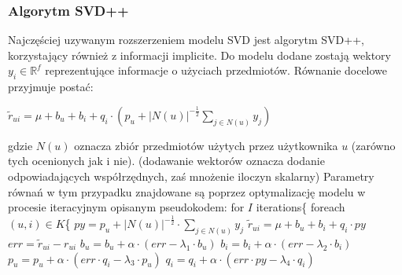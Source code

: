 \documentclass{pracamgr}
\begin{document}
    \subsubsection{Algorytm SVD++}
     Najczęściej uzywanym rozszerzeniem modelu SVD jest algorytm SVD++, korzystający również z informacji implicite.
     Do modelu dodane zostają wektory $y_i\in\mathbb{R}^f$ reprezentujące informacje o użyciach przedmiotów.
     Równanie docelowe przyjmuje postać:
     \begin{center}
      $\tilde{r}_{ui}=\mu+b_u+b_i+q_i\cdot\left(p_u +|N(u)|^{-\frac{1}{2}}\sum\limits_{j\in N(u)}y_j\right)$
     \end{center}
     gdzie $N(u)$ oznacza zbiór przedmiotów użytych przez użytkownika $u$ (zarówno tych ocenionych jak i nie).\newline
     {\scriptsize
      (dodawanie wektorów oznacza dodanie odpowiadających współrzędnych, zaś mnożenie iloczyn skalarny)
     }\newline
     Parametry równań w tym przypadku znajdowane są poprzez optymalizację modelu w procesie iteracyjnym opisanym pseudokodem:\newline\newline
    \hspace*{16pt}	for $I$ iterations\{\newline
    \hspace*{32pt}		foreach $(u,i)\in K$\{\newline
    \hspace*{48pt}			$py=p_u +|N(u)|^{-\frac{1}{2}}\cdot\sum\limits_{j\in N(u)}y_j$\newline
    \hspace*{48pt}			$\tilde{r}_{ui}=\mu+b_u+b_i+q_i\cdot py$\newline
    \hspace*{48pt}			$err=\tilde{r}_{ui}-r_{ui}$\newline
    \hspace*{48pt}			$b_u=b_u+\alpha\cdot(err-\lambda_1\cdot b_u)$\newline
    \hspace*{48pt}			$b_i=b_i+\alpha\cdot(err-\lambda_2\cdot b_i)$\newline
    \hspace*{48pt}			$p_u=p_u+\alpha\cdot(err\cdot q_i-\lambda_3\cdot p_u)$\newline
    \hspace*{48pt}			$q_i=q_i+\alpha\cdot(err\cdot py-\lambda_4\cdot q_i)$\newline
\end{document}
